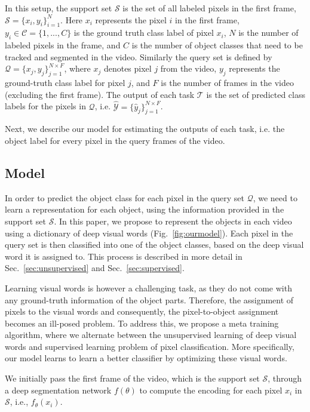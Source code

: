 \documentclass[10pt,twocolumn,letterpaper]{article}
\begin{document}
In this setup, the support set $\mathcal{S}$ is the set of all labeled pixels in the first frame, $ \mathcal{S} = \{ x_i, y_i \}_{i=1}^{N}$. Here $x_i$ represents the pixel $i$ in the first frame, $y_i \in \mathcal{C} = \{ 1,...,C \}$ is the ground truth class label of pixel $x_i$, $N$ is the number of labeled pixels in the frame, and $C$ is the number of object classes that need to be tracked and segmented in the video. Similarly the query set is defined by $ \mathcal{Q} = \{ x_j, y_j \}_{j=1}^{N\times F}$,  where $x_j$ denotes pixel $j$ from the video, $y_j$ represents the ground-truth class label for pixel $j$, and $F$ is the number of frames in the video (excluding the first frame). 
The output of each task $\mathcal{T}$ is the set of predicted class labels for the pixels in $ \mathcal{Q}$, i.e. $\mathcal{\hat{Y}} = \{\hat{y}_j\}_{j=1}^{N\times F}$. 
\fi

Next, we describe our model for estimating the outputs of each task, i.e. the object label for every pixel in the query frames of the video.

\subsection{Model}\label{sec:Model}
In order to predict the object class for each pixel in the query set $\mathcal{Q}$, we need to learn a representation for each object, using the information provided in the support set $\mathcal{S}$. In this paper, we propose to represent the objects in each video using a dictionary of deep visual words (Fig.~\ref{fig:ourmodel}). Each pixel in the query set is then classified into one of the object classes, based on the deep visual word it is assigned to.
This process is described in more detail in Sec.~\ref{sec:unsupervised} and Sec.~\ref{sec:supervised}. 

Learning visual words is however a challenging task, as they do not come with any ground-truth information of the object parts. Therefore, the assignment of pixels to the visual words and consequently, the pixel-to-object assignment becomes an ill-posed problem. To address this, we propose a meta training algorithm, where we alternate between the unsupervised learning of deep visual words and supervised learning problem of pixel classification. More specifically, our model learns to learn a better classifier by optimizing these visual words.

We initially pass the first frame of the video, which is the support set $\mathcal{S}$, through a deep segmentation network $f(\theta)$ to compute the encoding for each pixel $x_i$ in $\mathcal{S}$, i.e., $f_\theta(x_i)$. 
\end{document}
